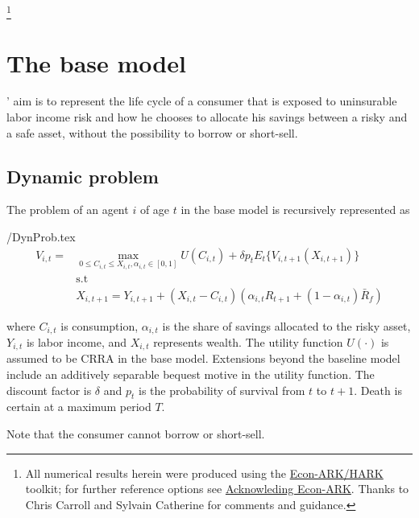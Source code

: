 \documentclass[./CGMPortfolio.tex]{subfiles}
\begin{document}
\thanks{All numerical results herein were produced using the \href{https://econ-ark/HARK}{Econ-ARK/HARK} toolkit; for further reference options see \href{https://econ-ark.org/acknowledging/}{Acknowleding Econ-ARK}.  Thanks to Chris Carroll and Sylvain Catherine for comments and guidance.}

\titlepagefinish

\newtheorem{defn}{Definition}
\newtheorem{theorem}{Theorem}

\hypertarget{The-base-model}{}
\section{The base model}

\cite{cgm2015}' aim is to represent the life cycle of a consumer that is 
exposed to uninsurable labor income risk and how he chooses to allocate his 
savings between a risky and a safe asset, without the possibility to borrow or 
short-sell.

\subsection{Dynamic problem}

The problem of an agent $i$ of age $t$ in the base model is recursively represented as

\begin{verbatimwrite}{\EqDir/DynProb.tex}
	\begin{align}
		V_{i,t} =& \max_{0\leq C_{i,t} \leq X_{i,t}, \alpha_{i,t}\in[0,1]} U(C_{i,t}) + \delta p_t E_t\{ V_{i,t+1} (X_{i,t+1}) \}\\
		&\text{s.t} \nonumber \\
		&X_{i,t+1} = Y_{i,t+1} + (X_{i,t} - C_{i,t})(\alpha_{i,t} R_{t+1} + (1-\alpha_{i,t})\bar{R}_f)
	\end{align}
\end{verbatimwrite}

where $C_{i,t}$ is consumption, $\alpha_{i,t}$ is the share of savings 
allocated to the risky asset, $Y_{i,t}$ is labor income, and $X_{i,t}$ 
represents wealth. The utility function $U(\cdot)$ is assumed to be CRRA in the 
base model. Extensions beyond the baseline model include an additively 
separable bequest motive in the utility function. The discount factor is 
$\delta$ and $p_t$ is the probability of survival from $t$ to $t+1$. Death is 
certain at a maximum period $T$.

Note that the consumer cannot borrow or short-sell.
\end{document}
